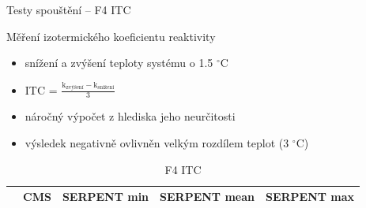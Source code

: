 \documentclass{beamer}
\begin{document}
\begin{frame}{Testy spouštění -- F4 ITC}

\begin{block}{}\small
	Měření izotermického koeficientu reaktivity 
\end{block}

\begin{itemize}\footnotesize
	\item snížení a zvýšení teploty systému o 1.5 $^\circ$C
\large	\item ITC =  $\frac{\textrm{k}_{\textrm{zvýšení}}-\textrm{k}_{\textrm{snížení}}}{
\textrm{3}}$

\footnotesize	\item náročný výpočet z hlediska jeho neurčitosti
\item výsledek negativně ovlivněn velkým rozdílem teplot (3 $^\circ$C)
\end{itemize}

\begin{table}[h]\scriptsize
	\begin{center}
		\begin{tabular}{ccccc}
			\toprule
			& CMS     & SERPENT \tiny min & SERPENT \tiny mean & SERPENT \tiny max\\
			\midrule
			
			\bottomrule
		\end{tabular}
		\caption{\footnotesize F4 ITC}
	\end{center}
\end{table}

\end{frame}
\end{document}
